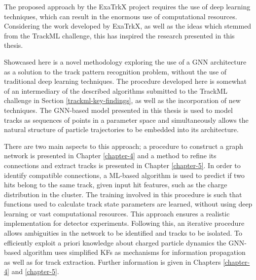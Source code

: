The proposed approach by the ExaTrkX project requires the use of deep learning techniques, which can result in the enormous use of computational resources. Considering the work developed by ExaTrkX, as well as the ideas which stemmed from the TrackML challenge, this has inspired the research presented in this thesis. 

Showcased here is a novel methodology exploring the use of a GNN architecture as a solution to the track pattern recognition problem, without the use of traditional deep learning techniques. The procedure developed here is somewhat of an intermediary of the described algorithms submitted to the TrackML challenge in Section \ref{trackml-key-findings}, as well as the incorporation of new techniques. The GNN-based model presented in this thesis is used to model tracks as sequences of points in a parameter space and simultaneously allows the natural structure of particle trajectories to be embedded into its architecture. 

There are two main aspects to this approach; a procedure to construct a graph network is presented in Chapter \ref{chapter-4} and a method to refine its connections and extract tracks is presented in Chapter \ref{chapter-5}. In order to identify compatible connections, a ML-based algorithm is used to predict if two hits belong to the same track, given input hit features, such as the charge distribution in the cluster. The training involved in this procedure is such that functions used to calculate track state parameters are learned, without using deep learning or vast computational resources. This approach ensures a realistic implementation for detector experiments. Following this, an iterative procedure allows ambiguities in the network to be identified and tracks to be isolated. To efficiently exploit a priori knowledge about charged particle dynamics the GNN-based algorithm uses simplified KFs as mechanisms for information propagation as well as for track extraction. Further information is given in Chapters \ref{chapter-4} and \ref{chapter-5}.